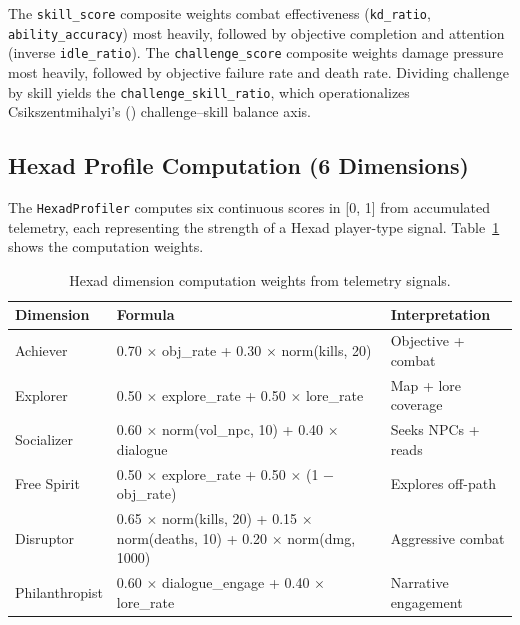 The \texttt{skill\_score} composite weights combat effectiveness (\texttt{kd\_ratio}, \texttt{ability\_accuracy}) most heavily, followed by objective completion and attention (inverse \texttt{idle\_ratio}). The \texttt{challenge\_score} composite weights damage pressure most heavily, followed by objective failure rate and death rate. Dividing challenge by skill yields the \texttt{challenge\_skill\_ratio}, which operationalizes Csikszentmihalyi's (\citeyear{csikszentmihalyi1990flow}) challenge--skill balance axis.

\subsection{Hexad Profile Computation (6 Dimensions)}

The \texttt{HexadProfiler} computes six continuous scores in [0, 1] from accumulated telemetry, each representing the strength of a Hexad player-type signal. Table~\ref{tab:hexad} shows the computation weights.

\begin{table}[H]
\centering
\caption{Hexad dimension computation weights from telemetry signals.}
\label{tab:hexad}
\small
\begin{tabular}{@{}p{2.5cm} p{7cm} p{3.5cm}@{}}
\toprule
\textbf{Dimension} & \textbf{Formula} & \textbf{Interpretation} \\
\midrule
Achiever & 0.70 $\times$ obj\_rate + 0.30 $\times$ norm(kills, 20) & Objective + combat \\
Explorer & 0.50 $\times$ explore\_rate + 0.50 $\times$ lore\_rate & Map + lore coverage \\
Socializer & 0.60 $\times$ norm(vol\_npc, 10) + 0.40 $\times$ dialogue & Seeks NPCs + reads \\
Free Spirit & 0.50 $\times$ explore\_rate + 0.50 $\times$ (1 $-$ obj\_rate) & Explores off-path \\
Disruptor & 0.65 $\times$ norm(kills, 20) + 0.15 $\times$ norm(deaths, 10) + 0.20 $\times$ norm(dmg, 1000) & Aggressive combat \\
Philanthropist & 0.60 $\times$ dialogue\_engage + 0.40 $\times$ lore\_rate & Narrative engagement \\
\bottomrule
\end{tabular}
\end{table}

